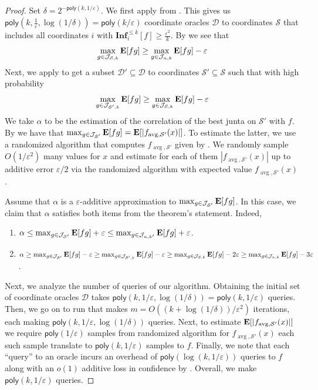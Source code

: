 \documentclass[10pt,a4paper]{article}
\providecommand{\poly}{\mathsf{poly}}
\theoremstyle{plain}
\theoremstyle{remark}
\theoremstyle{plain}
\providecommand{\E}{}
\renewcommand{\E}{\mathop{\bf E\/}}
\newcommand\Inf{{\mathbf{Inf}}}
\newcommand{\eps}{\varepsilon}
\newcommand{\calS}{\mathcal{S}}
\newcommand{\avg}{\operatorname{avg}}
\newcommand{\InfluentialCoords}{\calS}
\newcommand{\InfluentialOracles}{\mathcal{D}}
\renewcommand{\epsilon}{\varepsilon}
\begin{document}
\begin{proof}
Set $\delta = 2^{-\poly(k, 1/\eps)}$.
We first apply  from \cite{junta-coordinate-oracles}. This gives us $\poly(k, \frac{1}{\epsilon}, \log(1/\delta)) = \poly(k/\eps)$ coordinate oracles $\InfluentialOracles$ to coordinates $\InfluentialCoords$ that includes all coordinates $i$ with $\Inf_i^{\leq k}[f] \geq \frac{\epsilon^2}{k}$.
By  we see that $$\max_{g \in \mathcal{J}_{\InfluentialCoords,k}} \E[fg]\ge \max_{g \in \mathcal{J}_{n,k}}\E[fg] - \eps$$
Next, we apply  to get a subset $\InfluentialOracles' \subseteq \InfluentialOracles$ to coordinates $\InfluentialCoords' \subseteq \InfluentialCoords$ such that with high probability
 $$\max_{g \in \mathcal{J}_{\InfluentialCoords',k}} \E[fg]\ge \max_{g \in \mathcal{J}_{\InfluentialCoords,k}}\E[fg] - \eps$$
We take $\alpha$ to be the estimation of  the correlation of the best junta on $\InfluentialCoords'$ with $f$.
By  we have that $\max_{g \in \mathcal{J}_{\InfluentialCoords'}}\E[fg] = \E[|f_{\avg, \InfluentialCoords'}(x)|]$.
To estimate the latter, we use a randomized algorithm that computes $f_{\avg, \InfluentialCoords'}$ given by .
We randomly sample $O(1/\eps^2)$ many values for $x$ and estimate for each of them $|f_{\avg, \InfluentialCoords'}(x)|$ up to additive error $\eps/2$ via the randomized algorithm with expected value $f_{\avg, \InfluentialCoords'}(x)$.

Assume that $\alpha$ is a $\eps$-additive approximation to $\max_{g \in \mathcal{J}_{\InfluentialCoords'}} \E[fg]$.
In this case, we claim that $\alpha$ satisfies both items from the theorem's statement.
Indeed, 
\begin{enumerate}
	\item $\alpha \le \max_{g \in \mathcal{J}_{\InfluentialCoords'}} \E[fg] + \eps \le \max_{g \in \mathcal{J}_{n,k'}} \E[fg] + \eps$.
	\item $\alpha \ge \max_{g \in \mathcal{J}_{\InfluentialCoords'}} \E[fg] - \eps \ge \max_{g \in \mathcal{J}_{\InfluentialCoords',k}} \E[fg] -\eps \ge  \max_{g \in \mathcal{J}_{\InfluentialCoords,k}}\E[fg] - 2\eps
	\ge \max_{g \in \mathcal{J}_{n,k}}\E[fg] - 3\eps$.
\end{enumerate}

Next, we analyze the number of queries of our algorithm.
Obtaining the initial set of coordinate oracles $\InfluentialOracles$ takes $\poly(k, 1/\eps, \log(1/\delta)) = \poly(k,1/\eps)$ queries.
Then, we go on to run  that makes $m = O((k+ \log(1/\delta))/\epsilon^2)$ iterations, each making $\poly(k, 1/\eps,\log(1/\delta))$ queries.
Next, to estimate $\E[|f_{\avg, \InfluentialCoords'}(x)|]$ we require $\poly(1/\eps)$ samples from randomized algorithm for $f_{\avg, \InfluentialCoords'}(x)$ each such sample translate to $\poly(k, 1/\eps)$ samples to $f$. Finally, we note that each ``query'' to an oracle incurs an overhead of $\poly(\log(k,1/\eps))$ queries to $f$ along with an $o(1)$ additive loss in confidence by .
Overall, we make $\poly(k, 1/\eps)$ queries.
\end{proof}
\end{document}
